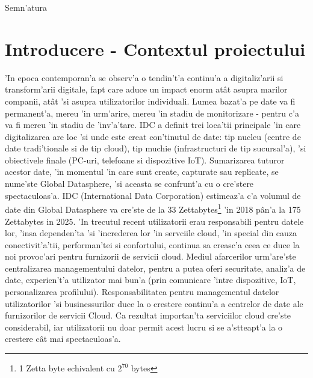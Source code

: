 \documentclass[12pt,a4paper,twoside]{report}
\begin{document}
\vspace{1cm}
\hspace{9.4cm}Semn'atura

\thispagestyle{empty}

\newpage




 

\newpage

\tableofcontents
\newpage



\chapter{Introducere - Contextul proiectului}
\pagestyle{headings}
'In epoca contemporan'a se observ'a o tendin't'a continu'a a digitaliz'arii si transform'arii digitale, fapt care aduce un impact enorm atât asupra marilor companii, atât 'si asupra utilizatorilor individuali. Lumea bazat'a pe date va fi permanent'a, mereu 'in urm'arire, mereu 'in stadiu de monitorizare - pentru c'a va fi mereu 'in stadiu de 'inv'a'tare.
IDC \cite{IDCdigitization}  a definit trei loca'tii principale 'in care digitalizarea are loc 'si unde este creat con'tinutul de date: tip nucleu (centre de date tradi'tionale si de tip cloud), tip muchie (infrastructuri de tip sucursal'a), 'si obiectivele finale (PC-uri, telefoane si dispozitive IoT). Sumarizarea tuturor acestor date, 'in momentul 'in care sunt  create, capturate sau replicate, se nume'ste Global Datasphere, 'si aceasta se confrunt'a cu o cre'stere spectaculoas'a. IDC (International Data Corporation) estimeaz'a c'a volumul de date din Global Datasphere va cre'ste de la 33 Zettabytes\footnote{1 Zetta byte echivalent cu $2^{70}$ bytes} 'in 2018 pân'a la 175 Zettabytes in 2025.
'In trecutul recent utilizatorii erau responsabili pentru datele lor, 'insa dependen'ta 'si 'increderea lor 'in servciile cloud, 'in special din  cauza conectivit'a'tii, performan'tei si confortului, continua sa creasc'a ceea ce duce la noi provoc'ari pentru furnizorii de servicii cloud. Mediul afarcerilor urm'are'ste centralizarea managementului datelor, pentru a putea oferi securitate, analiz'a de date, experien't'a utilizator mai bun'a (prin comunicare 'intre dispozitive, IoT, personalizarea profilului). Responsabilitatea pentru managementul datelor utilizatorilor 'si businessurilor duce la o crestere continu'a a centrelor de date ale furnizorilor de servicii Cloud. Ca rezultat importan'ta serviciilor cloud cre'ste considerabil, iar utilizatorii nu doar permit acest lucru si se a'stteapt'a la o crestere cât mai spectaculoas'a.
\end{document}
